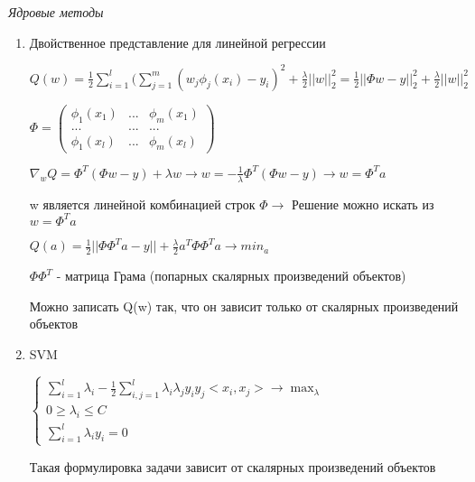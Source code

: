 \documentclass[a4paper, 12pt]{article}
\begin{document}
\begin{center}
    \textit{Ядровые методы}
\end{center}
\begin{enumerate}
    \item Двойственное представление для линейной регрессии
    \newline
    
    $Q(w) = \frac{1}{2}\sum_{i = 1}^{l}(\sum_{j = 1}^{m}(w_{j}\phi_{j}(x_{i}) - y_{i})^{2} + \frac{\lambda}{2}||w||^{2}_{2} = \frac{1}{2}||\Phi w - y||_{2}^{2} + \frac{\lambda}{2}||w||_{2}^{2}$
    \newline
    
    $\Phi = \begin{pmatrix}\phi_{1}(x_{1}) & ... & \phi_{m}(x_{1}) \\ ... & ... & ... \\ \phi_{1}(x_{l}) & ... & \phi_{m}(x_{l}) \end{pmatrix}$
    
    $\nabla_{w}Q = \Phi^{T}(\Phi w - y) + \lambda w \rightarrow w = -\frac{1}{\lambda}\Phi^{T}(\Phi w - y) \rightarrow w = \Phi^{T}a$
    \newline
    
    w является линейной комбинацией строк $\Phi \rightarrow$ Решение можно искать из $w = \Phi^{T}a$ 
    
    $Q(a) = \frac{1}{2}||\Phi \Phi^{T}a - y|| + \frac{\lambda}{2}a^{T} \Phi \Phi^{T}a \rightarrow min_{a}$
    \newline
    
    $\Phi \Phi^{T}$ - матрица Грама (попарных скалярных произведений объектов)
    \newline
    
    Можно записать Q(w) так, что он зависит только от скалярных произведений объектов
    
    \item SVM
    
    $\begin{cases}
    \sum_{i = 1}^{l} \lambda_{i} - \frac{1}{2} \sum_{i, j = 1}^{l} \lambda_{i}\lambda_{j}y_{i}y_{j}<x_{i}, x_{j}> \rightarrow \max_{\lambda} \\
    0 \geq \lambda_{i} \leq C
    \\
    \sum_{i = 1}^{l} \lambda_{i}y_{i} = 0
    \end{cases}$
    
    Такая формулировка задачи зависит от скалярных произведений объектов
    

\end{enumerate}
\end{document}
